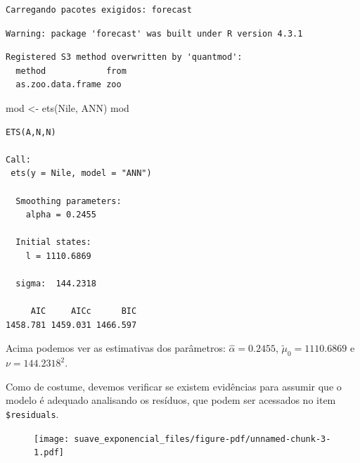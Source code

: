 \documentclass[
  letterpaper,
  DIV=11,
  numbers=noendperiod]{scrartcl}
\newenvironment{Shaded}{\begin{snugshade}}{\end{snugshade}}
\newcommand{\FunctionTok}[1]{\textcolor[rgb]{0.28,0.35,0.67}{#1}}
\newcommand{\NormalTok}[1]{\textcolor[rgb]{0.00,0.23,0.31}{#1}}
\newcommand{\OtherTok}[1]{\textcolor[rgb]{0.00,0.23,0.31}{#1}}
\newcommand{\SpecialCharTok}[1]{\textcolor[rgb]{0.37,0.37,0.37}{#1}}
\newcommand{\StringTok}[1]{\textcolor[rgb]{0.13,0.47,0.30}{#1}}
\theoremstyle{plain}
\theoremstyle{plain}
\theoremstyle{definition}
\theoremstyle{definition}
\theoremstyle{remark}
\begin{document}
\begin{verbatim}
Carregando pacotes exigidos: forecast
\end{verbatim}

\begin{verbatim}
Warning: package 'forecast' was built under R version 4.3.1
\end{verbatim}

\begin{verbatim}
Registered S3 method overwritten by 'quantmod':
  method            from
  as.zoo.data.frame zoo 
\end{verbatim}

\begin{Shaded}
\begin{Highlighting}[]
\NormalTok{mod }\OtherTok{\textless{}{-}} \FunctionTok{ets}\NormalTok{(Nile, }\StringTok{\textquotesingle{}ANN\textquotesingle{}}\NormalTok{)}
\NormalTok{mod}
\end{Highlighting}
\end{Shaded}

\begin{verbatim}
ETS(A,N,N) 

Call:
 ets(y = Nile, model = "ANN") 

  Smoothing parameters:
    alpha = 0.2455 

  Initial states:
    l = 1110.6869 

  sigma:  144.2318

     AIC     AICc      BIC 
1458.781 1459.031 1466.597 
\end{verbatim}

Acima podemos ver as estimativas dos parâmetros:
\(\hat{\alpha}=0.2455\), \(\tilde{\mu}_0=1110.6869\) e
\(\nu=144.2318^2\).

Como de costume, devemos verificar se existem evidências para assumir
que o modelo é adequado analisando os resíduos, que podem ser acessados
no item \texttt{\$residuals}.

\begin{Shaded}
\end{Shaded}

\begin{figure}[H]

{\centering \texttt{[image: suave\_exponencial\_files/figure-pdf/unnamed-chunk-3-1.pdf]}

}

\end{figure}
\end{document}
